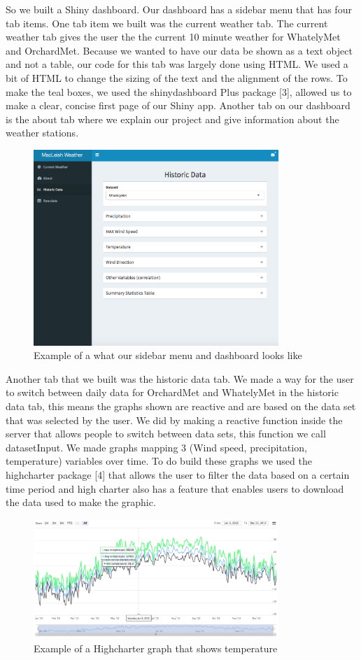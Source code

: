 \documentclass[10pt,letterpaper]{article}
\begin{document}
So we built a Shiny dashboard. Our dashboard has a sidebar menu that has
four tab items. One tab item we built was the current weather tab. The
current weather tab gives the user the the current 10 minute weather for
WhatelyMet and OrchardMet. Because we wanted to have our data be shown
as a text object and not a table, our code for this tab was largely done
using HTML. We used a bit of HTML to change the sizing of the text and
the alignment of the rows. To make the teal boxes, we used the
shinydashboard Plus package {[}3{]}, allowed us to make a clear, concise
first page of our Shiny app. Another tab on our dashboard is the about
tab where we explain our project and give information about the weather
stations.

\begin{figure}
\includegraphics[width=350px]{Weatherdashboard} \caption{Example of a what our sidebar menu and dashboard looks like}\label{fig:unnamed-chunk-2}
\end{figure}

Another tab that we built was the historic data tab. We made a way for
the user to switch between daily data for OrchardMet and WhatelyMet in
the historic data tab, this means the graphs shown are reactive and are
based on the data set that was selected by the user. We did by making a
reactive function inside the server that allows people to switch between
data sets, this function we call datasetInput. We made graphs mapping 3
(Wind speed, precipitation, temperature) variables over time. To do
build these graphs we used the highcharter package {[}4{]} that allows
the user to filter the data based on a certain time period and high
charter also has a feature that enables users to download the data used
to make the graphic.

\begin{figure}
\includegraphics[width=350px]{highchart} \caption{Example of a Highcharter graph that shows temperature}\label{fig:unnamed-chunk-3}
\end{figure}
\end{document}
